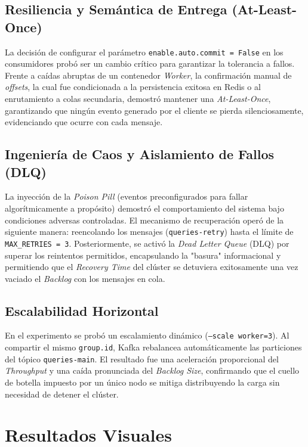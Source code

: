 \documentclass[letter,12pt]{article}
\begin{document}
\subsection{Resiliencia y Semántica de Entrega (At-Least-Once)}
La decisión de configurar el parámetro \texttt{enable.auto.commit = False} en los consumidores probó ser un cambio crítico para garantizar la tolerancia a fallos. Frente a caídas abruptas de un contenedor \textit{Worker}, la confirmación manual de \textit{offsets}, la cual fue condicionada a la persistencia exitosa en Redis o al enrutamiento a colas secundaria, demostró mantener una \textit{At-Least-Once}, garantizando que ningún evento generado por el cliente se pierda silenciosamente, evidenciando que ocurre con cada mensaje.

\subsection{Ingeniería de Caos y Aislamiento de Fallos (DLQ)}
La inyección de la \textit{Poison Pill} (eventos preconfigurados para fallar algorítmicamente a propósito) demostró el comportamiento del sistema bajo condiciones adversas controladas. El mecanismo de recuperación operó de la siguiente manera: reencolando los mensajes (\texttt{queries-retry}) hasta el límite de \texttt{MAX\_RETRIES = 3}. Posteriormente, se activó la \textit{Dead Letter Queue} (DLQ) por superar los reintentos permitidos, encapsulando la "basura" informacional y permitiendo que el \textit{Recovery Time} del clúster se detuviera exitosamente una vez vaciado el \textit{Backlog} con los mensajes en cola.

\subsection{Escalabilidad Horizontal}
En el experimento se probó un escalamiento dinámico (\texttt{--scale worker=3}). Al compartir el mismo \texttt{group.id}, Kafka rebalancea automáticamente las particiones del tópico \texttt{queries-main}. El resultado fue una aceleración proporcional del \textit{Throughput} y una caída pronunciada del \textit{Backlog Size}, confirmando que el cuello de botella impuesto por un único nodo se mitiga distribuyendo la carga sin necesidad de detener el clúster.


\section{Resultados Visuales}
\end{document}
